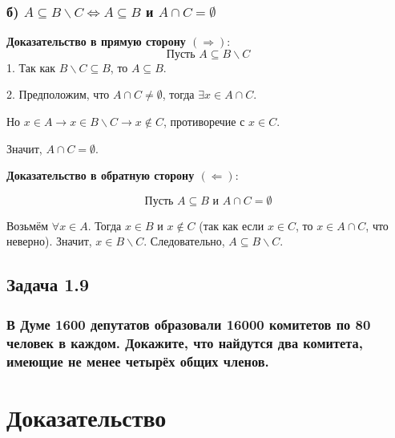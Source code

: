 \documentclass[12pt]{article}
\begin{document}
\subsubsection*{б) \( A \subseteq B \backslash C \iff A \subseteq B \) и \( A \cap C = \emptyset \)}

\textbf{Доказательство в прямую сторону \( (\Rightarrow) \)}:
\[
\text{Пусть } A \subseteq B \backslash C
\]
1. Так как \( B \backslash C \subseteq B \), то \( A \subseteq B \).

2. Предположим, что \( A \cap C \neq \emptyset \), тогда \( \exists x \in A \cap C \).

Но \( x \in A \rightarrow x \in B \backslash C \rightarrow x \notin C \), противоречие с \( x \in C \).

Значит, \( A \cap C = \emptyset \).

\textbf{Доказательство в обратную сторону \( (\Leftarrow) \)}:

\[
\text{Пусть } A \subseteq B \text{ и } A \cap C = \emptyset
\]

Возьмём \( \forall x \in A \). Тогда \( x \in B \) и \( x \notin C \) (так как если \( x \in C \), то \( x \in A \cap C \), что неверно).
Значит, \( x \in B \backslash C \).
Следовательно, \( A \subseteq B \backslash C \).

\subsection*{Задача 1.9}

\subsubsection*{В Думе 1600 депутатов образовали 16000 комитетов по 80 человек в каждом. Докажите, что найдутся два комитета, имеющие не менее четырёх общих членов.}

\section*{Доказательство}
\end{document}
